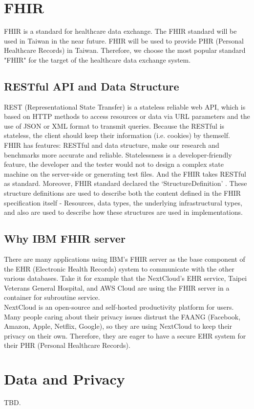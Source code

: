 \section{FHIR}
FHIR is a standard for healthcare data exchange. The FHIR standard will be used in
Taiwan in the near future. FHIR will be used to provide PHR (Personal Healthcare Records)
in Taiwan. Therefore, we choose the most popular standard "FHIR" for the target of
the healthcare data exchange system.

\subsection{RESTful API and Data Structure}
REST (Representational State Transfer) is a stateless reliable web API, which is based
on HTTP methods to access resources or data via URL parameters and the use of JSON or
XML format to transmit queries. Because the RESTful is stateless, the client should
keep their information (i.e. cookies) by themself.\\


FHIR has features: RESTful and data structure, make our research and benchmarks more accurate
and reliable.
Statelessness is a developer-friendly feature, the developer and the tester would not
to design a complex state machine on the server-side or generating test files. And the FHIR
takes RESTful as standard. Moreover, FHIR standard declared the `StructureDefinition'
\cite{fhir-StructureDefinition}.
These structure definitions are used to describe both the content defined in the FHIR
specification itself - Resources, data types, the underlying infrastructural types, and
also are used to describe how these structures are used in implementations.

\subsection{Why IBM FHIR server}
There are many applications using IBM's FHIR server as the base component of the EHR
(Electronic Health Records) system to communicate with the other various databases.
Take it for example that the NextCloud's EHR service, Taipei Veterans General Hospital,
and AWS Cloud are using the FHIR server in a container for subroutine service.\\

NextCloud is an open-source and self-hosted productivity platform for users.
Many people caring about their privacy issues distrust the FAANG (Facebook,
Amazon, Apple, Netflix, Google), so they are using NextCloud to keep their privacy
on their own. Therefore, they are eager to have a secure EHR system for their
PHR (Personal Healthcare Records).

\section{Data and Privacy}
TBD.
